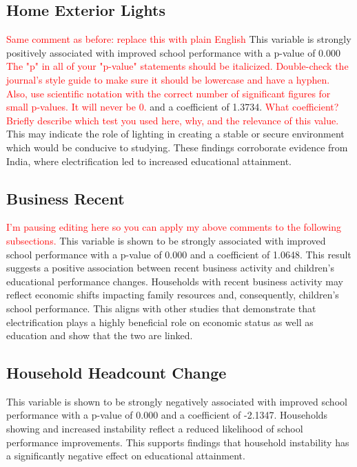 \documentclass[journal=jacsat,manuscript=article]{achemso}
\begin{document}
\subsection{Home Exterior Lights}
\textcolor{red}{Same comment as before: replace this with plain English}
This variable is strongly positively associated with improved school performance with a p-value of 0.000 \textcolor{red}{The "p" in all of your "p-value" statements should be italicized. Double-check the journal's style guide to make sure it should be lowercase and have a hyphen. Also, use scientific notation with the correct number of significant figures for small p-values. It will never be 0.} and a coefficient of 1.3734. \textcolor{red}{What coefficient? Briefly describe which test you used here, why, and the relevance of this value. }This may indicate the role of lighting in creating a stable or secure environment which would be conducive to studying. These findings corroborate evidence from India, where electrification led to increased educational attainment.\cite{Aklin2017}

\subsection{Business Recent}
\textcolor{red}{I'm pausing editing here so you can apply my above comments to the following subsections.}
This variable is shown to be strongly associated with improved school performance with a p-value of 0.000 and a coefficient of 1.0648. This result suggests a positive association between recent business activity and children's educational performance changes. Households with recent business activity may reflect economic shifts impacting family resources and, consequently, children's school performance. This aligns with other studies that demonstrate that electrification plays a highly beneficial role on economic status as well as education and show that the two are linked.\cite{Escap2021}

\subsection{Household Headcount Change}
This variable is shown to be strongly negatively associated with improved school performance with a p-value of 0.000 and a coefficient of -2.1347. Households showing and increased instability reflect a reduced likelihood of school performance improvements. This supports findings that household instability has a significantly negative effect on educational attainment.\cite{Perkins2019}
\end{document}
